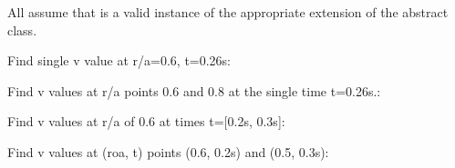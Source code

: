 \documentclass[letterpaper,10pt,english]{sphinxmanual}
\begin{document}
\begin{fulllineitems}
\begin{fulllineitems}
All assume that  is a valid instance of the appropriate
extension of the {\hyperref[\detokenize{eqtools:eqtools.core.Equilibrium}]{}} abstract class.

Find single v value at r/a=0.6, t=0.26s:

\begin{sphinxVerbatim}[commandchars=\\\{\}]
   
\end{sphinxVerbatim}

Find v values at r/a points 0.6 and 0.8 at the
single time t=0.26s.:

\begin{sphinxVerbatim}[commandchars=\\\{\}]
  \PYG{p}{[} \PYG{p}{]} 
\end{sphinxVerbatim}

Find v values at r/a of 0.6 at times t={[}0.2s, 0.3s{]}:

\begin{sphinxVerbatim}[commandchars=\\\{\}]
   \PYG{p}{[} \PYG{p}{]}
\end{sphinxVerbatim}

Find v values at (roa, t) points (0.6, 0.2s) and (0.5, 0.3s):

\begin{sphinxVerbatim}[commandchars=\\\{\}]
  \PYG{p}{[} \PYG{p}{]} \PYG{p}{[} \PYG{p}{]} 
\end{sphinxVerbatim}

\end{fulllineitems}



\end{fulllineitems}
\end{document}
